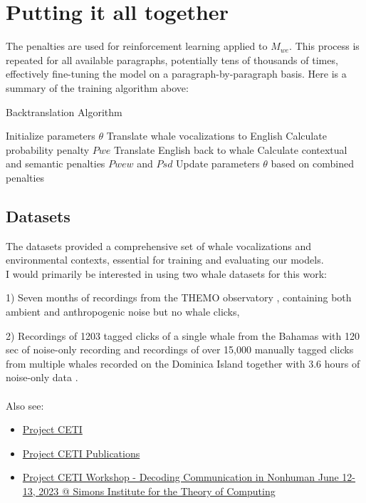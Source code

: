 \documentclass{article}
\begin{document}
\section{Putting it all together}
The penalties are used for reinforcement learning applied to $M_{we}$. This process is repeated for all available paragraphs, potentially tens of thousands of times, effectively fine-tuning the model on a paragraph-by-paragraph basis.
Here is a summary of the training algorithm above:
\begin{algorithm}
\caption{Backtranslation Algorithm}
\begin{algorithmic}[1]
\STATE Initialize parameters $\theta$
\STATE Translate whale vocalizations to English
\STATE Calculate probability penalty $Pwe$
\STATE Translate English back to whale
\STATE Calculate contextual and semantic penalties $Pwew$ and $Psd$
\STATE Update parameters $\theta$ based on combined penalties
\ENDFOR
\end{algorithmic}
\end{algorithm}
\subsection{Datasets}
The datasets provided a comprehensive set of whale vocalizations and environmental contexts, essential for training and evaluating our models.\\

I would primarily be interested in using two whale datasets for this work: 

1) Seven months of recordings from the THEMO observatory \cite{themo}, containing both ambient and anthropogenic noise but no whale clicks, 

2) Recordings of 1203 tagged clicks of a single whale from the Bahamas with 120 sec of noise-only recording and recordings of over 15,000 manually tagged clicks from multiple whales recorded on the Dominica Island together with 3.6 hours of noise-only data \cite{ceti}. \\ \\
Also see:
\begin{itemize}
    \item \href{https://www.projectceti.org/}{Project CETI}
    \item \href{https://www.projectceti.org/news-research-insights#publications}{Project CETI Publications}
    \item \href{https://www.youtube.com/playlist?list=PL-7Ju3RM0_oUKDIfBWlsOhONsXimWfMlF}{Project CETI Workshop - Decoding Communication in Nonhuman June 12-13, 2023 @ Simons Institute for the Theory of Computing}
\end{itemize}
\end{document}
